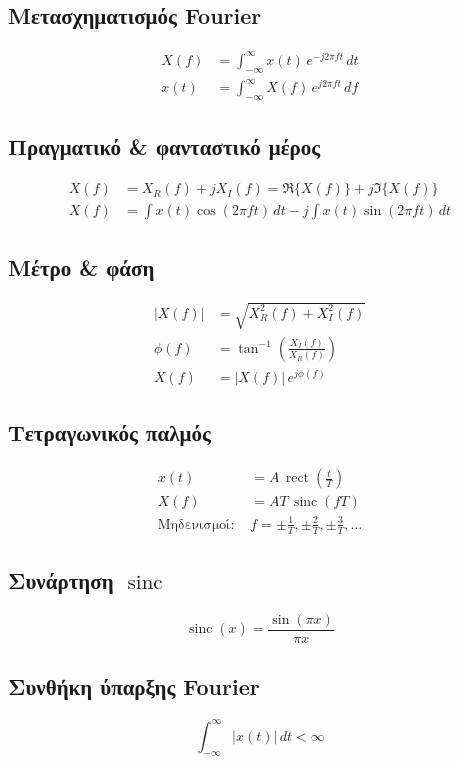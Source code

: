 \documentclass[11pt,a4paper]{article}
\newcommand{\rect}{\operatorname{rect}}
\newcommand{\sinc}{\operatorname{sinc}}
\begin{document}
\subsection{Μετασχηματισμός Fourier}
\begin{align}
X(f) &= \int_{-\infty}^{\infty} x(t)\,e^{-j2\pi f t}\,dt \\
x(t) &= \int_{-\infty}^{\infty} X(f)\,e^{j2\pi f t}\,df
\end{align}

\subsection{Πραγματικό \& φανταστικό μέρος}
\begin{align}
X(f) &= X_R(f) + jX_I(f) = \Re\{X(f)\} + j\Im\{X(f)\} \\
X(f) &= \int x(t)\cos(2\pi f t)\,dt - j\int x(t)\sin(2\pi f t)\,dt
\end{align}

\subsection{Μέτρο \& φάση}
\begin{align}
|X(f)| &= \sqrt{X_R^2(f) + X_I^2(f)} \\
\phi(f) &= \tan^{-1}\!\left(\frac{X_I(f)}{X_R(f)}\right) \\
X(f) &= |X(f)|\,e^{j\phi(f)}
\end{align}

\subsection{Τετραγωνικός παλμός}
\begin{align}
x(t) &= A\,\rect\!\left(\frac{t}{T}\right) \\
X(f) &= AT\,\sinc(fT) \\
\text{Μηδενισμοί: } & f = \pm\frac{1}{T}, \pm\frac{2}{T}, \pm\frac{3}{T}, \ldots
\end{align}

\subsection{Συνάρτηση $\sinc$}
\begin{equation}
\sinc(x) = \frac{\sin(\pi x)}{\pi x}
\end{equation}

\subsection{Συνθήκη ύπαρξης Fourier}
\begin{equation}
\int_{-\infty}^{\infty} |x(t)|\,dt < \infty
\end{equation}
\end{document}
